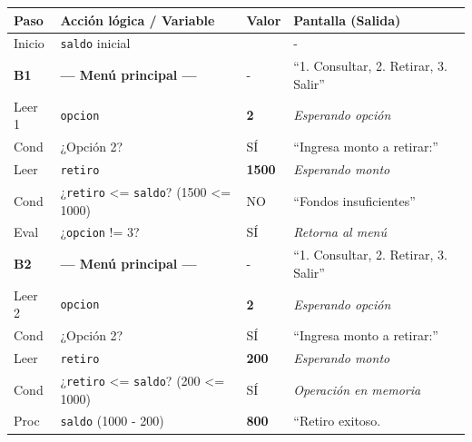 {\def\LTcaptype{none} %
\begin{longtable}[]{@{}
  >{\centering\arraybackslash}p{}
  >{\raggedright\arraybackslash}p{}
  >{\centering\arraybackslash}p{}
  >{\raggedright\arraybackslash}p{}@{}}
\toprule\noalign{}
\begin{minipage}[b]{\linewidth}\centering
Paso
\end{minipage} & \begin{minipage}[b]{\linewidth}\raggedright
Acción lógica / Variable
\end{minipage} & \begin{minipage}[b]{\linewidth}\centering
Valor
\end{minipage} & \begin{minipage}[b]{\linewidth}\raggedright
Pantalla (Salida)
\end{minipage} \\
\midrule\noalign{}
\endhead
\bottomrule\noalign{}
\endlastfoot
Inicio & \texttt{saldo} inicial & 1000 & - \\
\textbf{B1} & \textbf{--- Menú principal ---} & - & ``1. Consultar, 2.
Retirar, 3. Salir'' \\
Leer 1 & \texttt{opcion} & \textbf{2} & \emph{Esperando opción} \\
Cond & ¿Opción 2? & SÍ & ``Ingresa monto a retirar:'' \\
Leer & \texttt{retiro} & \textbf{1500} & \emph{Esperando monto} \\
Cond & ¿\texttt{retiro} \textless= \texttt{saldo}? (1500 \textless=
1000) & NO & ``Fondos insuficientes'' \\
Eval & ¿\texttt{opcion} != 3? & SÍ & \emph{Retorna al menú} \\
\textbf{B2} & \textbf{--- Menú principal ---} & - & ``1. Consultar, 2.
Retirar, 3. Salir'' \\
Leer 2 & \texttt{opcion} & \textbf{2} & \emph{Esperando opción} \\
Cond & ¿Opción 2? & SÍ & ``Ingresa monto a retirar:'' \\
Leer & \texttt{retiro} & \textbf{200} & \emph{Esperando monto} \\
Cond & ¿\texttt{retiro} \textless= \texttt{saldo}? (200 \textless= 1000)
& SÍ & \emph{Operación en memoria} \\
Proc & \texttt{saldo} (1000 - 200) & \textbf{800} & ``Retiro exitoso.

\end{longtable}}
